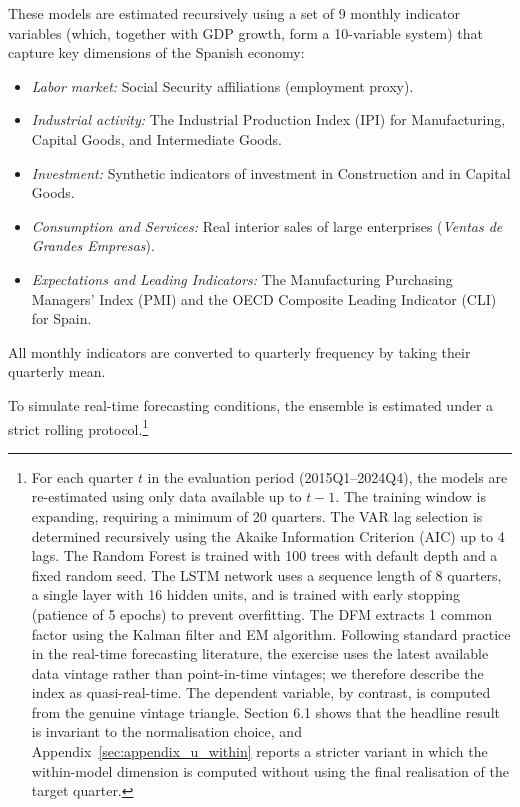 \documentclass[12pt,a4paper]{article}
\theoremstyle{remark}
\begin{document}
These models are estimated recursively using a set of 9 monthly indicator variables (which, together with GDP growth, form a 10-variable system) that capture key dimensions of the Spanish economy:
\begin{itemize}
    \item \textit{Labor market:} Social Security affiliations (employment proxy).
    \item \textit{Industrial activity:} The Industrial Production Index (IPI) for Manufacturing, Capital Goods, and Intermediate Goods.
    \item \textit{Investment:} Synthetic indicators of investment in Construction and in Capital Goods.
    \item \textit{Consumption and Services:} Real interior sales of large enterprises (\textit{Ventas de Grandes Empresas}).
    \item \textit{Expectations and Leading Indicators:} The Manufacturing Purchasing Managers' Index (PMI) and the OECD Composite Leading Indicator (CLI) for Spain.
\end{itemize}
All monthly indicators are converted to quarterly frequency by taking their quarterly mean. 

To simulate real-time forecasting conditions, the ensemble is estimated under a strict rolling protocol.\footnote{For each quarter $t$ in the evaluation period (2015Q1--2024Q4), the models are re-estimated using only data available up to $t-1$. The training window is expanding, requiring a minimum of 20 quarters. The VAR lag selection is determined recursively using the Akaike Information Criterion (AIC) up to 4 lags. The Random Forest is trained with 100 trees with default depth and a fixed random seed. The LSTM network uses a sequence length of 8 quarters, a single layer with 16 hidden units, and is trained with early stopping (patience of 5 epochs) to prevent overfitting. The DFM extracts 1 common factor using the Kalman filter and EM algorithm. Following standard practice in the real-time forecasting literature, the exercise uses the latest available data vintage rather than point-in-time vintages; we therefore describe the index as quasi-real-time. The dependent variable, by contrast, is computed from the genuine vintage triangle. Section 6.1 shows that the headline result is invariant to the normalisation choice, and Appendix~\ref{sec:appendix_u_within} reports a stricter variant in which the within-model dimension is computed without using the final realisation of the target quarter.}
\end{document}
